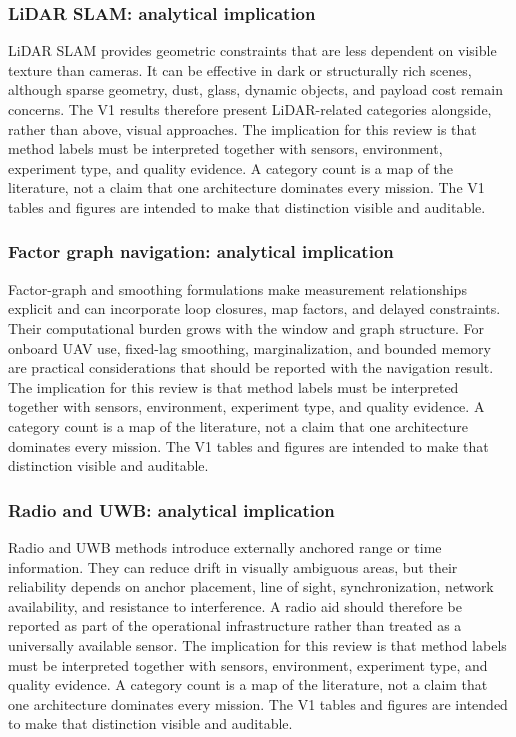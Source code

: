 \documentclass[
  journal,
  10pt]{IEEEtran}
\begin{document}
\subsubsection{LiDAR SLAM: analytical
implication}\label{lidar-slam-analytical-implication}

LiDAR SLAM provides geometric constraints that are less dependent on
visible texture than cameras. It can be effective in dark or
structurally rich scenes, although sparse geometry, dust, glass, dynamic
objects, and payload cost remain concerns. The V1 results therefore
present LiDAR-related categories alongside, rather than above, visual
approaches. The implication for this review is that method labels must
be interpreted together with sensors, environment, experiment type, and
quality evidence. A category count is a map of the literature, not a
claim that one architecture dominates every mission. The V1 tables and
figures are intended to make that distinction visible and auditable.

\subsubsection{Factor graph navigation: analytical
implication}\label{factor-graph-navigation-analytical-implication}

Factor-graph and smoothing formulations make measurement relationships
explicit and can incorporate loop closures, map factors, and delayed
constraints. Their computational burden grows with the window and graph
structure. For onboard UAV use, fixed-lag smoothing, marginalization,
and bounded memory are practical considerations that should be reported
with the navigation result. The implication for this review is that
method labels must be interpreted together with sensors, environment,
experiment type, and quality evidence. A category count is a map of the
literature, not a claim that one architecture dominates every mission.
The V1 tables and figures are intended to make that distinction visible
and auditable.

\subsubsection{Radio and UWB: analytical
implication}\label{radio-and-uwb-analytical-implication}

Radio and UWB methods introduce externally anchored range or time
information. They can reduce drift in visually ambiguous areas, but
their reliability depends on anchor placement, line of sight,
synchronization, network availability, and resistance to interference. A
radio aid should therefore be reported as part of the operational
infrastructure rather than treated as a universally available sensor.
The implication for this review is that method labels must be
interpreted together with sensors, environment, experiment type, and
quality evidence. A category count is a map of the literature, not a
claim that one architecture dominates every mission. The V1 tables and
figures are intended to make that distinction visible and auditable.
\end{document}
